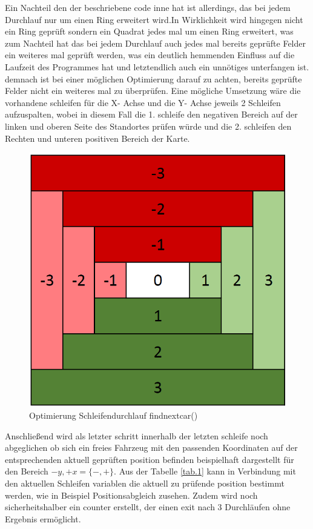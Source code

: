 Ein Nachteil den der beschriebene code inne hat ist allerdings, das bei jedem Durchlauf nur um einen Ring erweitert wird.In Wirklichkeit wird hingegen nicht ein Ring geprüft sondern ein Quadrat jedes mal um einen Ring erweitert, was zum Nachteil hat das bei jedem Durchlauf auch jedes mal bereits geprüfte Felder ein weiteres mal geprüft werden, was ein deutlich hemmenden Einfluss auf die Laufzeit des Programmes hat und letztendlich auch ein unnötiges unterfangen ist. demnach ist bei einer möglichen Optimierung darauf zu achten, bereits geprüfte Felder nicht ein weiteres mal zu überprüfen. Eine mögliche Umsetzung wäre die vorhandene schleifen für die X- Achse  und die Y- Achse jeweils 2 Schleifen aufzuspalten, wobei in diesem Fall die 1. schleife den negativen Bereich auf der linken und oberen Seite des Standortes prüfen würde und die 2. schleifen den Rechten und unteren positiven Bereich der Karte.
\begin{figure}[h]
\caption{Optimierung Schleifendurchlauf findnextcar()}
\centering
\includegraphics[scale=0.5]{opti_findnextcar}
\end{figure}
Anschließend wird als letzter schritt innerhalb der letzten schleife noch abgeglichen ob sich ein freies Fahrzeug mit den passenden Koordinaten auf der entsprechenden aktuell geprüften position befinden beispielhaft dargestellt für den Bereich $-y,+x = \{-,+\}$. Aus der Tabelle \ref{tab.1} kann in Verbindung mit den  aktuellen Schleifen variablen die aktuell zu prüfende position bestimmt werden, wie in Beispiel Positionsabgleich zusehen. Zudem wird noch sicherheitshalber ein counter erstellt, der einen exit nach 3 Durchläufen ohne Ergebnis ermöglicht.

